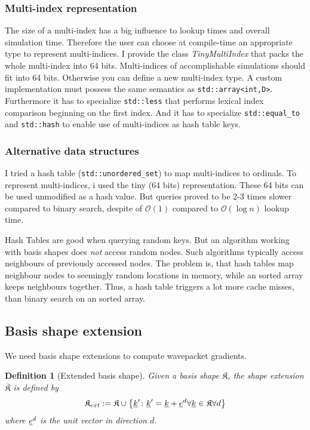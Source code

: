 \documentclass{article}
\def\code#1{\texttt{#1}}
\def\classname#1{\textit{#1}}
\newtheorem{definition}{Definition}
\begin{document}
\subsubsection{Multi-index representation}
The size of a multi-index has a big influence to lookup times and
overall simulation time. Therefore the user can choose at compile-time an appropriate
type to represent multi-indices. I provide the class \classname{TinyMultiIndex}
that packs the whole multi-index into 64 bits.
Multi-indices of accomplishable simulations should fit into 64 bits.
Otherwise you can define a new multi-index type. A custom implementation
must possess the same semantics as \code{std::array<int,D>}.
Furthermore it has to specialize \code{std::less} that performs lexical index comparison
beginning on the first index.
And it has to specialize \code{std::equal\_to} and \code{std::hash} to
enable use of multi-indices as hash table keys.

\subsubsection{Alternative data structures}
I tried a hash table (\code{std::unordered\_set}) to map multi-indices to ordinals.
To represent multi-indices, i used the tiny (64 bits) representation.
These 64 bits can be used unmodified as a hash value.
But queries proved to be 2-3 times slower compared to binary search,
despite of \(\mathcal{O}(1)\) compared to \(\mathcal{O}(\log{}n)\) lookup time.
\par
Hash Tables are good when querying random keys. But an algorithm working
with basis shapes does \emph{not} access random nodes.
Such algorithms typically access neighbours of previously accessed nodes.
The problem is, that hash tables
map neighbour nodes to seemingly random locations in memory,
while an sorted array keeps neighbours together. Thus, a hash table triggers
a lot more cache misses, than binary search on an sorted array.

\subsection{Basis shape extension}

We need basis shape extensions to compute wavepacket gradients.

\begin{definition}[Extended basis shape]
  Given a basis shape \( \mathfrak{K} \),
  the shape extension \( \overline{\mathfrak{K}} \) is defined by
  \begin{equation}
    \mathfrak{K}_{ext} := \mathfrak{K} \cup 
    \left\{\underline{k}' \colon \underline{k}' = \underline{k} + \underline{e}^d 
      \forall \underline{k} \in \mathfrak{K} \forall d\right\}
  \end{equation}
  where \( \underline{e}^d \) is the unit vector in direction \( d \).
\end{definition}
\end{document}
